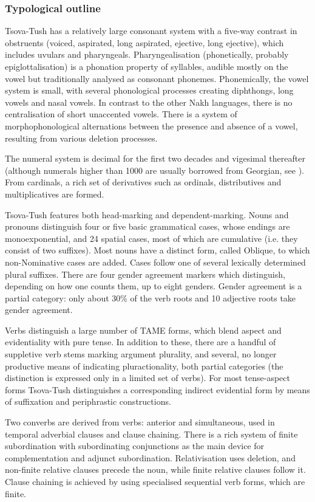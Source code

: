 \subsubsection{Typological outline} \label{outline}

Tsova-Tush has a relatively large consonant system with a five-way contrast in obstruents (voiced, aspirated, long aspirated, ejective, long ejective), which includes uvulars and pharyngeals. Pharyngealisation (phonetically, probably epiglottalisation)  is a phonation property of syllables, audible mostly on the vowel but traditionally analysed as consonant phonemes. Phonemically, the vowel system is small, with several phonological processes creating diphthongs, long vowels and nasal vowels. In contrast to the other Nakh languages, there is no centralisation of short unaccented vowels. 
There is a system of morphophonological alternations between the presence and absence of a vowel, resulting from various deletion processes.

The numeral system is decimal for the first two decades and vigesimal thereafter (although numerals higher than 1000 are usually borrowed from Georgian, see ). From cardinals, a rich set of derivatives such as ordinals, distributives and multiplicatives are formed.

Tsova-Tush features both head-marking and dependent-marking. Nouns and pronouns distinguish four or five basic grammatical cases, whose endings are monoexponential, and 24 spatial cases, most of which are cumulative (i.e. they consist of two suffixes). Most nouns have a distinct form, called Oblique, to which non-Nominative cases are added. Cases follow one of several lexically determined plural suffixes. There are four gender agreement markers which distinguish, depending on how one counts them, up to eight genders. Gender agreement is a partial category: only about 30\% of the verb roots and 10 adjective roots take gender agreement. 

Verbs distinguish a large number of TAME forms, which blend aspect and evidentiality with pure tense. In addition to these, there are a handful of suppletive verb stems marking argument plurality, and several, no longer productive means of indicating pluractionality, both partial categories (the distinction is expressed only in a limited set of verbs). For most tense-aspect forms Tsova-Tush distinguishes a corresponding indirect evidential form by means of suffixation and periphrastic constructions.

Two converbs are derived from verbs: anterior and simultaneous, used in temporal adverbial clauses and clause chaining. There is a rich system of finite subordination with subordinating conjunctions as the main device for complementation and adjunct subordination. Relativisation uses deletion, and non-finite relative clauses precede the noun, while finite relative clauses follow it. Clause chaining is achieved by using specialised sequential verb forms, which are finite.

